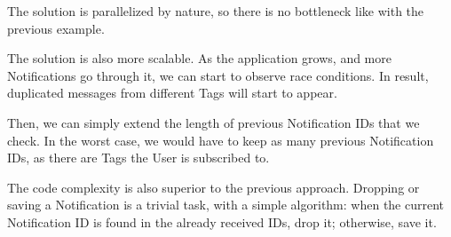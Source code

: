 The solution is parallelized by nature,
so there is no bottleneck
like with the previous example.

The solution is also more scalable.
As the application grows,
and more Notifications go through it,
we can start to observe race conditions.
In result,
duplicated messages from different Tags
will start to appear.

Then, we can simply extend the length of
previous Notification IDs that we check.
In the worst case,
we would have to keep as many previous
Notification IDs,
as there are Tags the User is subscribed to.

The code complexity is also superior
to the previous approach.
Dropping or saving a Notification is a trivial task,
with a simple algorithm:
when the current Notification ID is found in the
already received IDs, drop it; otherwise, save it.
